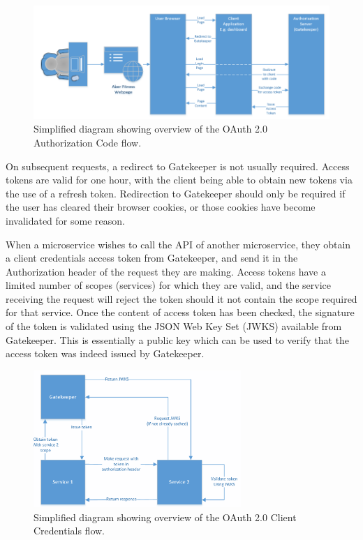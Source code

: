 \begin{figure}[H]
    \centering
    \includegraphics[width=\textwidth]{Images/gatekeeper_authcode_flow.png}
    \caption{Simplified diagram showing overview of the OAuth 2.0 Authorization Code flow.}
\end{figure}

On subsequent requests, a redirect to Gatekeeper is not usually required. Access tokens are valid for one hour, with the client being able to obtain new tokens via the use of a refresh token. Redirection to Gatekeeper should only be required if the user has cleared their browser cookies, or those cookies have become invalidated for some reason.

When a microservice wishes to call the API of another microservice, they obtain a client credentials access token from Gatekeeper, and send it in the Authorization header of the request they are making. Access tokens have a limited number of scopes (services) for which they are valid, and the service receiving the request will reject the token should it not contain the scope required for that service. Once the content of access token has been checked, the signature of the token is validated using the JSON Web Key Set (JWKS) available from Gatekeeper. This is essentially a public key which can be used to verify that the access token was indeed issued by Gatekeeper.

\begin{figure}[H]
    \centering
    \includegraphics[width=0.7\textwidth]{Images/gatekeeper_clientcredentials_flow.png}
    \caption{Simplified diagram showing overview of the OAuth 2.0 Client Credentials flow.}
\end{figure}

